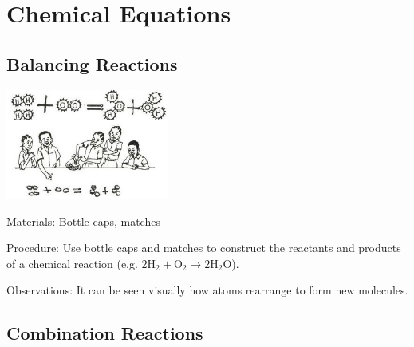 \section{Chemical Equations}

\begin{multicols}{2}




\subsection{Balancing Reactions}

\begin{center}
\includegraphics[width=0.4\textwidth]{./img/source/chem-equations.jpg}
\end{center}

\begin{description*}
\item[Materials:]{Bottle caps, matches}
\item[Procedure:]{Use bottle caps and matches to construct the reactants and products of a chemical reaction (e.g. $2\mathrm{H}_2 + \mathrm{O}_2 \longrightarrow 2\mathrm{H}_2\mathrm{O}$). }
\item[Observations:]{It can be seen visually how atoms rearrange to form new molecules.}
\end{description*}

\subsection{Combination Reactions}


\end{multicols}
